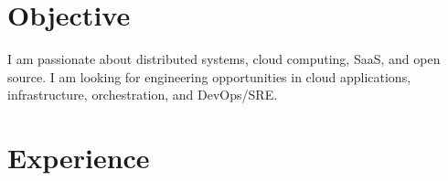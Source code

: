 \documentclass[]{cv-style}                     %
\begin{document}

\section{Objective}

I am passionate about distributed systems, cloud computing, SaaS, and open source.
I am looking for engineering opportunities in cloud applications, infrastructure, orchestration, and DevOps/SRE.



\section{Experience}
\end{document}
